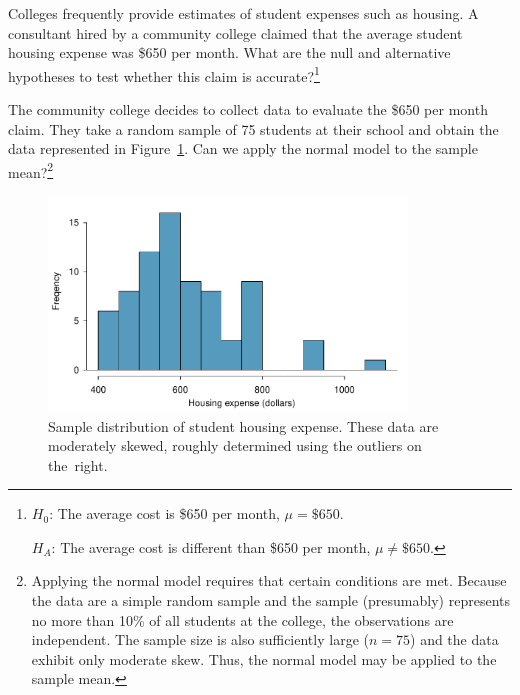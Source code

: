 \begin{exercise} \label{htForHousingExpenseForCommunityCollege650}
Colleges frequently provide estimates of student expenses such as housing. A consultant hired by a community college claimed that the average student housing expense was \$650 per month. What are the null and alternative hypotheses to test whether this claim is accurate?\footnote{$H_0$: The average cost is \$650 per month, $\mu = \$650$.

\hspace{3.4mm}$H_A$: The average cost is different than \$650 per month, $\mu \neq \$650$.}
\end{exercise}

\begin{exercise} \label{normalDistCondForHousingExpenseForCommunityCollege650}
The community college decides to collect data to evaluate the \$650 per month claim. They take a random sample of 75 students at their school and obtain the data represented in Figure~\ref{communityCollegeClaimedHousingExpenseDistribution}. Can we apply the normal model to the sample mean?\footnote{Applying the normal model requires that certain conditions are met. Because the data are a simple random sample and the sample (presumably) represents no more than 10\% of all students at the college, the observations are independent. The sample size is also sufficiently large ($n=75$) and the data exhibit only moderate skew. Thus, the normal model may be applied to the sample mean.}

\begin{figure}
\centering
\includegraphics[width=0.85\textwidth]{ch_inference_foundations/figures/communityCollegeClaimedHousingExpenseDistribution/communityCollegeClaimedHousingExpenseDistribution}
\caption{Sample distribution of student housing expense. These data are moderately skewed, roughly determined using the outliers on the~right.}
\label{communityCollegeClaimedHousingExpenseDistribution}
\end{figure}
\end{exercise}



